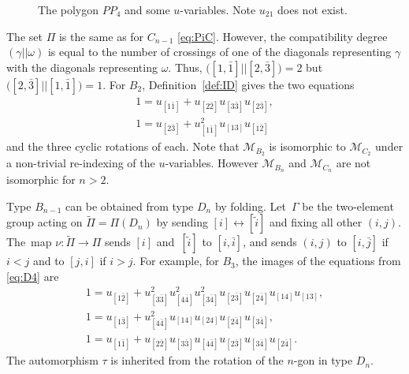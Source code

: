 \documentclass[pdftex]{sigma}%
\def\M{{\mathcal{M}}}
\def\tPi{{\tilde \Pi}}
\numberwithin{equation}{section}
\begin{document}
\begin{figure}
\centering
{}
\caption{The polygon $PP_4$ and some $u$-variables. Note $u_{21}$ does not exist.}\label{d4}
\end{figure}

\medskip{} %
The set $\Pi$ is the same as for $C_{n-1}$ \eqref{eq:PiC}. However, the compatibility degree $(\gamma||\omega)$ is equal to the number of crossings of one of the diagonals representing $\gamma$ with the diagonals representing $\omega$. Thus, $\big([1, \bar 1]||[2, \bar 3]\big) =2$ but $\big([2,\bar 3] || [1,\bar 1]\big) = 1$. For $B_2$, Definition~\ref{def:ID} gives the two equations
\begin{gather*}
1 = u_{[1 \bar 1]} + u_{[2 \bar 2]} u_{[3 \bar 3]} u_{[2 \bar 3]},
\\
1 = u_{[2 \bar 3]} + u_{[1 \bar 1]}^2 u_{[13]} u_{[1 \bar 2]}
\end{gather*}
and the three cyclic rotations of each. Note that $\M_{B_2}$ is isomorphic to $\M_{C_2}$ under a non-trivial re-indexing of the $u$-variables. However $\M_{B_n}$ and $\M_{C_n}$ are not isomorphic for $n >2$.

Type $B_{n-1}$ can be obtained from type $D_n$ by folding. Let~$\Gamma$ be the two-element group acting on $\tPi = \Pi(D_n)$ by sending $[i] \leftrightarrow [\tilde i]$ and fixing all other $(i,j)$. The~map $\nu\colon \tPi \to \Pi$ sends $[i]$ and~$[\tilde i]$ to $[i,\bar i]$, and sends $(i,j)$ to $[i, \bar j]$ if $i < j$ and to $[j, i]$ if $ i > j$. For example, for $B_3$, the images of the equations from \eqref{eq:D4} are
\begin{gather}
1 = u_{[1 \bar 2]} + u_{[3\bar 3]}^2 u_{[4 \bar 4]}^2 u_{[3 \bar 4]}^2 u_{[2 \bar 3]} u_{[2 \bar 4]} u_{[14]} u_{[13]},\nonumber
\\
1 =u_{[1 \bar 3]} + u_{[4 \bar 4]}^2 u_{[1 4]}u_{[2 4]} u_{[2 \bar4]} u_{[3 \bar 4]},\nonumber
\\
1 = u_{[1\bar 1]}+ u_{[2\bar 2]} u_{[3 \bar 3]} u_{[4 \bar 4]} u_{[2 \bar 3]} u_{[3 \bar 4]} u_{[2 \bar 4]}.
\label{eq:B3}
\end{gather}
The automorphism $\tau$ is inherited from the rotation of the $n$-gon in type $D_n$.
\end{document}
